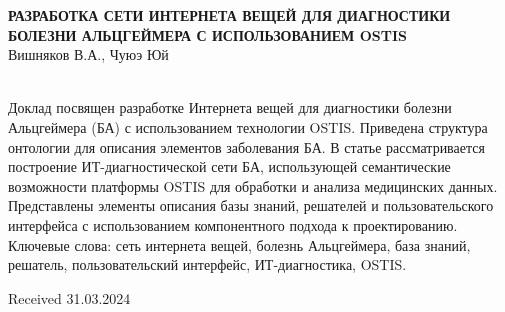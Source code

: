 \documentclass[10pt, a4paper]{article}
\begin{document}
\begin{SCn}
\begin{small}
\begin{multicols}{2}
\begin{center}
\large
\textbf{РАЗРАБОТКА СЕТИ ИНТЕРНЕТА ВЕЩЕЙ ДЛЯ ДИАГНОСТИКИ БОЛЕЗНИ АЛЬЦГЕЙМЕРА С ИСПОЛЬЗОВАНИЕМ OSTIS}\\
\normalsize
Вишняков В.А., Чуюэ Юй
\end{center}\\
\indent
Доклад посвящен разработке Интернета вещей для диагностики болезни Альцгеймера (БА) с использованием
технологии OSTIS. Приведена структура онтологии для
описания элементов заболевания БА. В статье рассматривается построение ИТ-диагностической сети БА, использующей семантические возможности платформы OSTIS для
обработки и анализа медицинских данных. Представлены
элементы описания базы знаний, решателей и пользовательского интерфейса с использованием компонентного подхода
к проектированию.\\
\indent
Ключевые слова: сеть интернета вещей, болезнь Альцгеймера, база знаний, решатель, пользовательский интерфейс,
ИТ-диагностика, OSTIS.\\
\begin{flushright}
Received 31.03.2024
\end{flushright}
\end{multicols}
\end{small}
\end{SCn}
\end{document}
